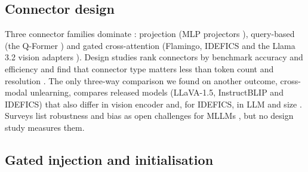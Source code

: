\subsection{Connector design}

Three connector families dominate \citep{yin2024mllmsurvey,huang2025vitsurvey}: projection (MLP projectors
\citep{liu2024llava15}), query-based (the Q-Former \citep{li2023blip2}) and gated cross-attention (Flamingo, IDEFICS and the
Llama 3.2 vision adapters \citep{alayrac2022flamingo,laurencon2023obelics,grattafiori2024llama3}). Design studies rank
connectors by benchmark accuracy and efficiency \citep{mckinzie2024mm1,cha2024honeybee,karamcheti2024prismatic,tong2024cambrian} and find that connector type matters less than token count and resolution \citep{mckinzie2024mm1}. The only
three-way comparison we found on another outcome, cross-modal unlearning, compares released models (LLaVA-1.5, InstructBLIP
and IDEFICS) that also differ in vision encoder and, for IDEFICS, in LLM and size \citep{balaji2026forget}. Surveys list robustness and bias as open challenges for MLLMs
\citep{awais2025foundation,zhang2024vlmsurvey}, but no design study measures them.

\subsection{Gated injection and initialisation}

